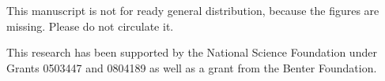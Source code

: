\noindent





\bigskip




\newpage

This manuscript is not for ready general distribution,
because the figures are missing.  Please do not circulate it.


\bigskip\noindent %
This research has been supported by the National Science Foundation
under Grants 0503447 and 0804189 as well as a grant from the Benter
Foundation.

\bigskip\noindent\svninfo 

\newpage

